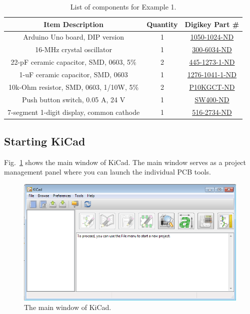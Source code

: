 \documentclass[12pt,letterpaper]{scrartcl}
\begin{document}
\begin{table}[h]
\centering
\caption{List of components for Example 1.}
\begin{tabular}{|c|c|c|}
\hline \bf  Item Description & \bf Quantity & \bf Digikey Part \# \\ 
\hline \hline  Arduino Uno board, DIP version & 1 & \href{http://www.digikey.com/product-detail/en/A000066/1050-1024-ND/2784006}{1050-1024-ND} \\ 
\hline  16-MHz crystal oscillator &  1 & \href{http://www.digikey.com/product-search/en?KeyWords=300-8499-ND}{300-6034-ND} \\ 
\hline  22-pF ceramic capacitor, SMD, 0603, 5\% & 2 & \href{http://www.digikey.com/product-detail/en/C1608C0G1H220J080AA/445-1273-1-ND/567670}{445-1273-1-ND}  \\ 
\hline  1-uF ceramic capacitor, SMD, 0603 & 1 & \href{http://www.digikey.com/product-detail/en/CL10F105ZP8NNNC/1276-1041-1-ND/3889127}{1276-1041-1-ND}  \\ 
\hline  10k-Ohm resistor, SMD, 0603, 1/10W, 5\% & 2 & \href{http://www.digikey.com/product-detail/en/ERJ-3GEYJ103V/P10KGCT-ND/134717}{P10KGCT-ND} \\ 
\hline  Push button switch, 0.05 A, 24 V  & 1 & \href{http://www.digikey.com/product-search/en?KeyWords=SW400-ND}{SW400-ND} \\ 
\hline  7-segment 1-digit display, 
common cathode & 1 & \href{http://www.digikey.com/product-detail/en/HDSP-313E/516-2734-ND/2219051}{516-2734-ND} \\ 
\hline 
\end{tabular} 
\label{tab:example1}
\end{table}

\subsection{Starting KiCad}

Fig.~\ref{fig:kicad-main} shows the main window of KiCad. The main window serves as a project management panel where you can launch the individual PCB tools. 

\begin{figure}[ht]
\centering
\includegraphics[width=5in]{kicad-main.png}
\caption{The main window of KiCad.}
\label{fig:kicad-main}
\end{figure}
\end{document}
